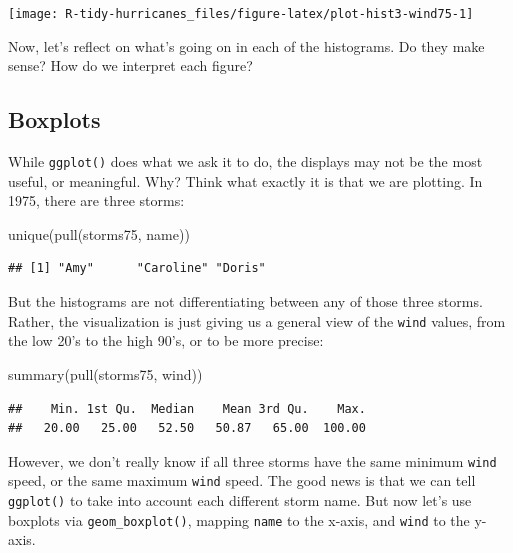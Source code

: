 \documentclass[
]{book}
\newenvironment{Shaded}{\begin{snugshade}}{\end{snugshade}}
\newcommand{\FunctionTok}[1]{\textcolor[rgb]{0.00,0.00,0.00}{#1}}
\newcommand{\NormalTok}[1]{#1}
\begin{document}
\begin{center}\texttt{[image: R-tidy-hurricanes\_files/figure-latex/plot-hist3-wind75-1]} \end{center}

Now, let's reflect on what's going on in each of the histograms. Do they make
sense? How do we interpret each figure?

\hypertarget{boxplots}{%
\subsection{Boxplots}\label{boxplots}}

While \texttt{ggplot()} does what we ask it to do, the displays may not be the most
useful, or meaningful. Why? Think what exactly it is that we are plotting.
In 1975, there are three storms:

\begin{Shaded}
\begin{Highlighting}[]
\FunctionTok{unique}\NormalTok{(}\FunctionTok{pull}\NormalTok{(storms75, name))}
\end{Highlighting}
\end{Shaded}

\begin{verbatim}
## [1] "Amy"      "Caroline" "Doris"
\end{verbatim}

But the histograms are not differentiating between any of those three storms.
Rather, the visualization is just giving us a general view of the \texttt{wind} values,
from the low 20's to the high 90's, or to be more precise:

\begin{Shaded}
\begin{Highlighting}[]
\FunctionTok{summary}\NormalTok{(}\FunctionTok{pull}\NormalTok{(storms75, wind))}
\end{Highlighting}
\end{Shaded}

\begin{verbatim}
##    Min. 1st Qu.  Median    Mean 3rd Qu.    Max. 
##   20.00   25.00   52.50   50.87   65.00  100.00
\end{verbatim}

However, we don't really know if all three storms have the same minimum \texttt{wind}
speed, or the same maximum \texttt{wind} speed. The good news is that we can tell
\texttt{ggplot()} to take into account each different storm name. But now let's use
boxplots via \texttt{geom\_boxplot()}, mapping \texttt{name} to the x-axis, and \texttt{wind} to the y-axis.
\end{document}
